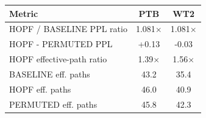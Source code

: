 \begin{tabular}{lcc}
\toprule
Metric & PTB & WT2 \\
\midrule
HOPF / BASELINE PPL ratio & 1.081$\times$ & 1.081$\times$ \\
HOPF - PERMUTED PPL & +0.13 & -0.03 \\
HOPF effective-path ratio & 1.39$\times$ & 1.56$\times$ \\
BASELINE eff. paths & 43.2 & 35.4 \\
HOPF eff. paths & 46.0 & 40.9 \\
PERMUTED eff. paths & 45.8 & 42.3 \\
\bottomrule
\end{tabular}
